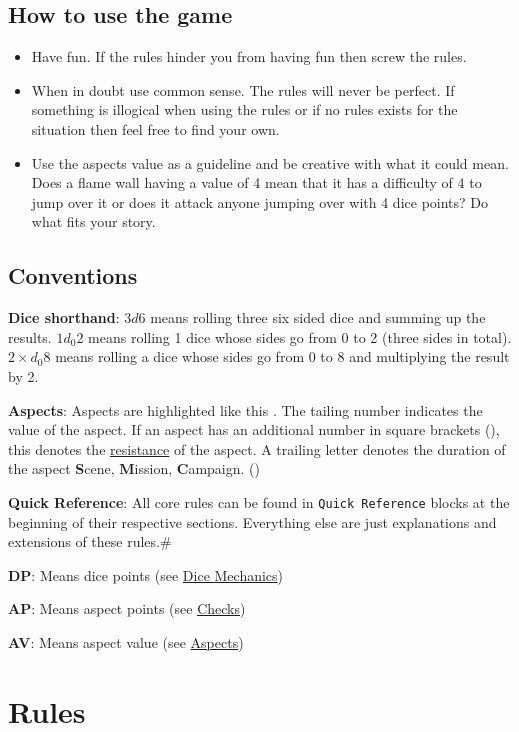 \documentclass[11pt]{article}
\begin{document}
{\subsection{How to use the game}
\label{sec:org2816116}


\begin{itemize}
\item Have fun. If the rules hinder you from having fun then screw the rules.
\item When in doubt use common sense. The rules will never be perfect. If something is illogical when using the rules or if no rules exists for the situation then feel free to find your own.
\item Use the aspects value as a guideline and be creative with what it could mean. Does a flame wall having a value of 4 mean that it has a difficulty of 4 to jump over it or does it attack anyone jumping over with 4 dice points? Do what fits your story.
\end{itemize}
\subsection{Conventions}
\label{sec:org367e353}
\textbf{Dice shorthand}: \(3 d 6\) means rolling three six sided dice and summing up the results. \(1 d_0 2\) means rolling 1 dice whose sides go from 0 to 2 (three sides in total). \(2 \times d_0 8\) means rolling a dice whose sides go from 0 to 8 and multiplying the result by 2.

\textbf{Aspects}: Aspects are highlighted like this . The tailing number indicates the value of the aspect. If an aspect has an additional number in square brackets (), this denotes the \hyperref[sec:org034cc47]{resistance} of the aspect. A trailing letter denotes the duration of the aspect \textbf{S}cene, \textbf{M}ission, \textbf{C}ampaign. ()

\textbf{Quick Reference}: All core rules can be found in \texttt{Quick Reference} blocks at the beginning of their respective sections. Everything else are just explanations and extensions of these rules.\#

\textbf{DP}: Means dice points (see \hyperref[sec:orge9ea528]{Dice Mechanics})

\textbf{AP}: Means aspect points (see \hyperref[sec:org09241a8]{Checks})

\textbf{AV}: Means aspect value (see \hyperref[sec:org48de6b9]{Aspects})
\section{Rules}
\label{sec:org1fa8431}

}
\end{document}

